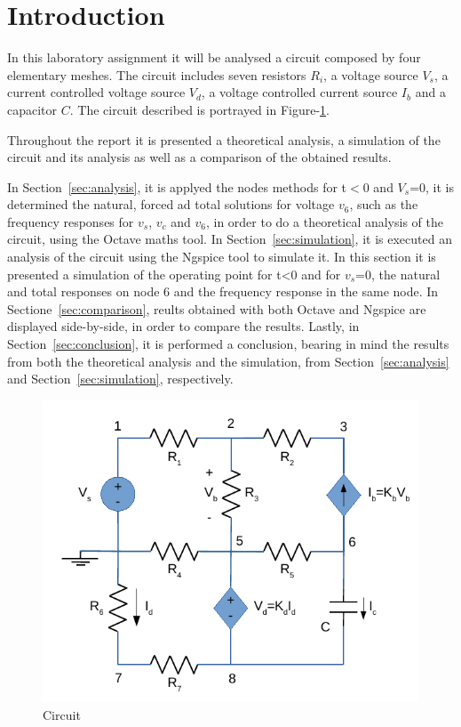 \section{Introduction}
\label{sec:introduction}

In this laboratory assignment it will be analysed a circuit composed by four
elementary meshes. The circuit includes seven resistors $R_i$, a voltage source
$V_s$, a current controlled voltage source $V_d$, a voltage controlled current
source $I_b$ and a capacitor $C$. The circuit described is portrayed in
Figure-\ref{fig:circuit}.

Throughout the report it is presented a theoretical analysis, a simulation of the
circuit and its analysis as well as a comparison of the obtained results. \par
In Section~\ref{sec:analysis}, it is applyed the nodes methods for t$<$0 and $V_s$=0,
it is determined the natural, forced ad total solutions for voltage $v_6$, such as
the frequency responses for $v_s$, $v_c$ and $v_6$, in order to do a theoretical
analysis of the circuit, using the Octave maths tool.
In Section~\ref{sec:simulation}, it is executed an analysis of the circuit using
the Ngspice tool to simulate it. In this section it is presented a simulation of
the operating point for t<0 and for $v_s$=0, the natural and total responses on node 6
and the frequency response in the same node.
In Sectione~\ref{sec:comparison}, reults obtained with both Octave and Ngspice are
displayed side-by-side, in order to compare the results.
Lastly, in Section~\ref{sec:conclusion}, it is performed a conclusion, bearing in mind the
results from both the theoretical analysis and the simulation, from Section~\ref{sec:analysis}
and Section~\ref{sec:simulation}, respectively.


\begin{figure}[h] \centering
\includegraphics[width=0.7\linewidth]{circuit.pdf}
\caption{Circuit}
\label{fig:circuit}
\end{figure}

\newpage
